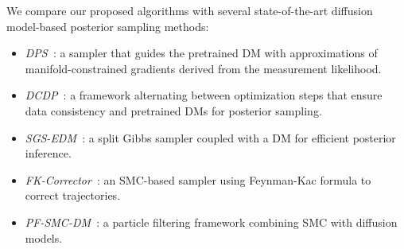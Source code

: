 \documentclass{article}
\numberwithin{equation}{section}
\begin{document}
We compare our proposed algorithms with several state-of-the-art diffusion model-based posterior sampling methods:
\begin{itemize}[leftmargin=1.5em, itemsep=0pt, topsep=0pt, parsep=0pt]
    \item \emph{DPS~\cite{chung2022diffusion}}: a sampler that guides the pretrained DM with approximations of manifold-constrained gradients derived from the measurement likelihood.
    \item \emph{DCDP~\cite{li2024decoupled}}: a framework alternating between optimization steps that ensure data consistency and pretrained DMs for posterior sampling.
    \item \emph{SGS-EDM~\cite{wu2024principled}}: a split Gibbs sampler coupled with a DM for efficient posterior inference.
    \item \emph{FK-Corrector~\cite{skreta2025feynman}}: an SMC-based sampler using Feynman-Kac formula to correct trajectories.
    \item \emph{PF-SMC-DM~\cite{dou2024diffusion}}: a particle filtering framework combining SMC with diffusion models.
\end{itemize}
\end{document}
